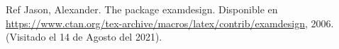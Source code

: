 \begin{sphinxthebibliography}{Ref}
\sphinxAtStartPar
Jason, Alexander. The package examdesign. Disponible en \url{https://www.ctan.org/tex-archive/macros/latex/contrib/examdesign}, 2006. (Visitado el 14 de Agosto del 2021).
\end{sphinxthebibliography}